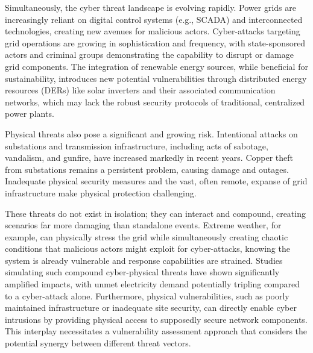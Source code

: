 \documentclass[10pt,twocolumn,letterpaper]{article}
\begin{document}

Simultaneously, the cyber threat landscape is evolving rapidly. Power grids are increasingly reliant on digital control systems (e.g., SCADA) and interconnected technologies, creating new avenues for malicious actors. \cite{CraigFields} 
Cyber-attacks targeting grid operations are growing in sophistication and frequency, with state-sponsored actors and criminal groups demonstrating the capability to disrupt or damage grid components. \cite{number9} 
The integration of renewable energy sources, while beneficial for sustainability, introduces new potential vulnerabilities through distributed energy resources (DERs) like solar inverters and their associated communication networks, which may lack the robust security protocols of traditional, centralized power plants. \cite{number14} 

Physical threats also pose a significant and growing risk. Intentional attacks on substations and transmission infrastructure, including acts of sabotage, vandalism, and gunfire, have increased markedly in recent years. \cite{number14} 
Copper theft from substations remains a persistent problem, causing damage and outages. \cite{number15} 
Inadequate physical security measures and the vast, often remote, expanse of grid infrastructure make physical protection challenging. \cite{number15} 

These threats do not exist in isolation; they can interact and compound, creating scenarios far more damaging than standalone events. Extreme weather, for example, can physically stress the grid while simultaneously creating chaotic conditions that malicious actors might exploit for cyber-attacks, knowing the system is already vulnerable and response capabilities are strained. \cite{number20} 
Studies simulating such compound cyber-physical threats have shown significantly amplified impacts, with unmet electricity demand potentially tripling compared to a cyber-attack alone.\cite{number20} 
Furthermore, physical vulnerabilities, such as poorly maintained infrastructure or inadequate site security, can directly enable cyber intrusions by providing physical access to supposedly secure network components. \cite{number15} 
This interplay necessitates a vulnerability assessment approach that considers the potential synergy between different threat vectors.
\end{document}
